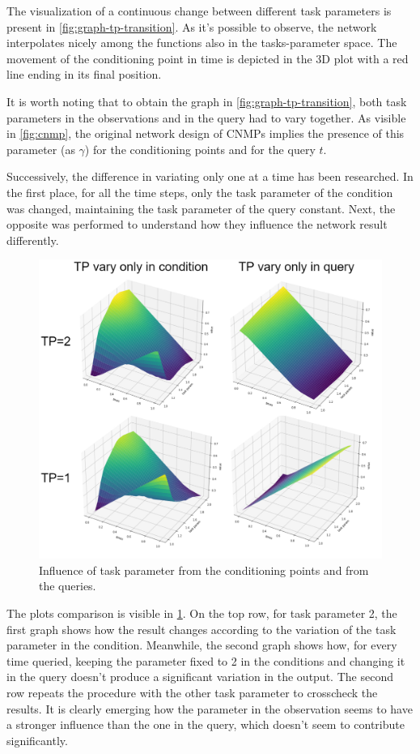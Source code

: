 The visualization of a continuous change between different task parameters is present in \cref{fig:graph-tp-transition}. As it's possible to observe, the network interpolates nicely among the functions also in the tasks-parameter space. The movement of the conditioning point in time is depicted in the 3D plot with a red line ending in its final position.

It is worth noting that to obtain the graph in \cref{fig:graph-tp-transition}, both task parameters in the observations and in the query had to vary together. As visible in \cref{fig:cnmp}, the original network design of CNMPs implies the presence of this parameter (as $\gamma$) for the conditioning points and for the query $t$.

Successively, the difference in variating only one at a time has been researched. In the first place, for all the time steps, only the task parameter of the condition was changed, maintaining the task parameter of the query constant. Next, the opposite was performed to understand how they influence the network result differently.

\begin{figure}
    \centering
    \includegraphics[width=0.8\linewidth]{figures/comparisonCNMPtp-influence.png}
    \caption{ Influence of task parameter from the conditioning points and from the queries. }
    \label{fig:tp-influence}
\end{figure}

The plots comparison is visible in \cref{fig:tp-influence}. On the top row, for task parameter 2, the first graph shows how the result changes according to the variation of the task parameter in the condition. Meanwhile, the second graph shows how, for every time queried, keeping the parameter fixed to 2 in the conditions and changing it in the query doesn't produce a significant variation in the output. 
The second row repeats the procedure with the other task parameter to crosscheck the results. 
It is clearly emerging how the parameter in the observation seems to have a stronger influence than the one in the query, which doesn't seem to contribute significantly. 

